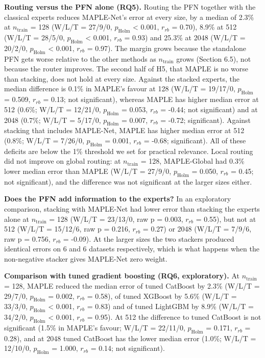 \documentclass[mathematics,article,submit,pdftex,moreauthors]{Definitions/mdpi}
\begin{document}
\textbf{Routing versus the PFN alone (RQ5).} Routing the PFN together with the classical experts reduces MAPLE-Net's error at every size, by a median of 2.3\% at $n_{\mathrm{train}}$ = 128 (W/L/T = 27/9/0, $p_{\mathrm{Holm}}$ < 0.001, $r_{rb}$ = 0.70), 8.9\% at 512 (W/L/T = 28/5/0, $p_{\mathrm{Holm}}$ < 0.001, $r_{rb}$ = 0.93) and 25.3\% at 2048 (W/L/T = 20/2/0, $p_{\mathrm{Holm}}$ < 0.001, $r_{rb}$ = 0.97). The margin grows because the standalone PFN gets worse relative to the other methods as $n_{\mathrm{train}}$ grows (Section 6.5), not because the router improves. The second half of H5, that MAPLE is no worse than stacking, does not hold at every size. Against the stacked experts, the median difference is 0.1\% in MAPLE's favour at 128 (W/L/T = 19/17/0, $p_{\mathrm{Holm}}$ = 0.509, $r_{rb}$ = 0.13; not significant), whereas MAPLE has higher median error at 512 (0.6\%; W/L/T = 12/21/0, $p_{\mathrm{Holm}}$ = 0.053, $r_{rb}$ = -0.44; not significant) and at 2048 (0.7\%; W/L/T = 5/17/0, $p_{\mathrm{Holm}}$ = 0.007, $r_{rb}$ = -0.72; significant). Against stacking that includes MAPLE-Net, MAPLE has higher median error at 512 (0.8\%; W/L/T = 7/26/0, $p_{\mathrm{Holm}}$ = 0.001, $r_{rb}$ = -0.68; significant). All of these deficits are below the 1\% threshold we set for practical relevance. Local routing did not improve on global routing: at $n_{\mathrm{train}}$ = 128, MAPLE-Global had 0.3\% lower median error than MAPLE (W/L/T = 27/9/0, $p_{\mathrm{Holm}}$ = 0.050, $r_{rb}$ = 0.45; not significant), and the difference was not significant at the larger sizes either.

\textbf{Does the PFN add information to the experts?} In an exploratory comparison, stacking with MAPLE-Net had lower error than stacking the experts alone at $n_{\mathrm{train}}$ = 128 (W/L/T = 23/13/0, raw p = 0.003, $r_{rb}$ = 0.55), but not at 512 (W/L/T = 15/12/6, raw p = 0.216, $r_{rb}$ = 0.27) or 2048 (W/L/T = 7/9/6, raw p = 0.756, $r_{rb}$ = -0.09). At the larger sizes the two stackers produced identical errors on 6 and 6 datasets respectively, which is what happens when the non-negative stacker gives MAPLE-Net zero weight.

\textbf{Comparison with tuned gradient boosting (RQ6, exploratory).} At $n_{\mathrm{train}}$ = 128, MAPLE reduced the median error of tuned CatBoost by 2.3\% (W/L/T = 29/7/0, $p_{\mathrm{Holm}}$ = 0.002, $r_{rb}$ = 0.58), of tuned XGBoost by 5.6\% (W/L/T = 33/3/0, $p_{\mathrm{Holm}}$ < 0.001, $r_{rb}$ = 0.83) and of tuned LightGBM by 8.9\% (W/L/T = 34/2/0, $p_{\mathrm{Holm}}$ < 0.001, $r_{rb}$ = 0.95). At 512 the difference to tuned CatBoost is not significant (1.5\% in MAPLE's favour; W/L/T = 22/11/0, $p_{\mathrm{Holm}}$ = 0.171, $r_{rb}$ = 0.28), and at 2048 tuned CatBoost has the lower median error (1.0\%; W/L/T = 12/10/0, $p_{\mathrm{Holm}}$ = 1.000, $r_{rb}$ = 0.14; not significant).
\end{document}
